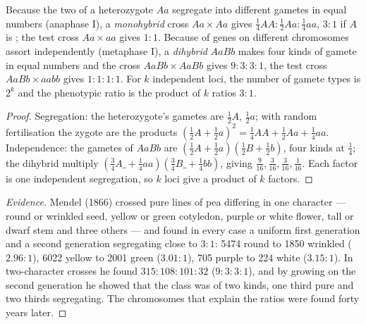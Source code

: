 \begin{theorem}\label{thm:b2:meiosis-heredity:mendel}
Because the two  of a heterozygote $Aa$ segregate into
different gametes in equal numbers (anaphase I), a \emph{monohybrid}
cross $Aa \times Aa$ gives  $\tfrac14 AA : \tfrac12 Aa :
\tfrac14 aa$,  $3 : 1$ if $A$ is ; the test cross
$Aa \times aa$ gives $1 : 1$. Because  of genes on different
chromosomes assort independently (metaphase I), a \emph{dihybrid}
$AaBb$ makes four kinds of gamete in equal numbers and the cross
$AaBb \times AaBb$ gives  $9 : 3 : 3 : 1$, the test cross
$AaBb \times aabb$ gives $1 : 1 : 1 : 1$. For $k$ independent
 loci, the number of gamete types is $2^k$ and the
phenotypic ratio is the product of $k$ ratios $3 : 1$.
\end{theorem}
\begin{proof}
Segregation: the heterozygote's gametes are $\tfrac12 A$,
$\tfrac12 a$; with random fertilisation the zygote  are the
products $(\tfrac12 A + \tfrac12 a)^2 = \tfrac14 AA + \tfrac12 Aa +
\tfrac14 aa$. Independence: the gametes of $AaBb$ are $(\tfrac12 A
+ \tfrac12 a)(\tfrac12 B + \tfrac12 b)$, four kinds at $\tfrac14$;
the dihybrid  multiply $(\tfrac34 A\_ + \tfrac14 aa)
(\tfrac34 B\_ + \tfrac14 bb)$, giving $\tfrac{9}{16}, \tfrac{3}{16},
\tfrac{3}{16}, \tfrac{1}{16}$. Each factor is one independent
segregation, so $k$ loci give a product of $k$ factors.
\end{proof}
\begin{proof}[Evidence]
Mendel (1866) crossed pure lines of pea differing in one character
--- round or wrinkled seed, yellow or green cotyledon, purple or
white flower, tall or dwarf stem and three others --- and found in
every case a uniform first generation and a second generation
segregating close to $3 : 1$: 5474 round to 1850 wrinkled ($2.96 :
1$), 6022 yellow to 2001 green ($3.01 : 1$), 705 purple to 224 white
($3.15 : 1$). In two-character crosses he found $315 : 108 : 101 :
32$ ($9 : 3 : 3 : 1$), and by growing on the second generation he
showed that the  class was of two kinds, one third pure and
two thirds segregating. The chromosomes that explain the ratios were
found forty years later.
\end{proof}

